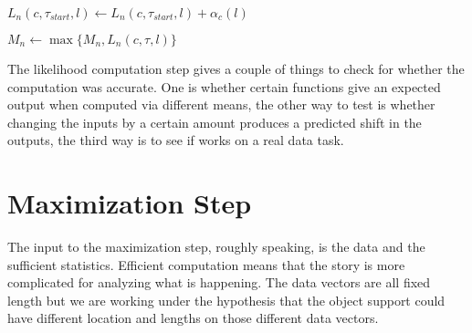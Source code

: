 \documentclass{article}
\begin{document}
\begin{algorithm}
\begin{algorithmic}[1]
                   \ENDIF
                   
                   \STATE $L_n(c,\tau_{start},l)\gets L_n(c,\tau_{start},l) + \alpha_c(l)$

                   \STATE $M_n \gets \max\{ M_n, L_n(c,\tau,l) \}$
               \ENDFOR
           \ENDFOR
       \ENDFOR
   \ENDFOR
           
\end{algorithmic}
\end{algorithm}

The likelihood computation step gives a couple of things to check for
whether the computation was accurate.  One is whether certain functions
give an expected output when computed via different means, the other way
to test is whether changing the inputs by a certain amount produces a 
predicted shift in the outputs, the third way is to see if works on a real
data task.

\section{Maximization Step}


The input to the maximization step, roughly speaking, is the data and
the sufficient statistics.  Efficient computation means that the story
is more complicated for analyzing what is happening.  The data vectors are
all fixed length but we are working under the hypothesis that the object
support could have different location and lengths on those different
data vectors.
\end{document}
